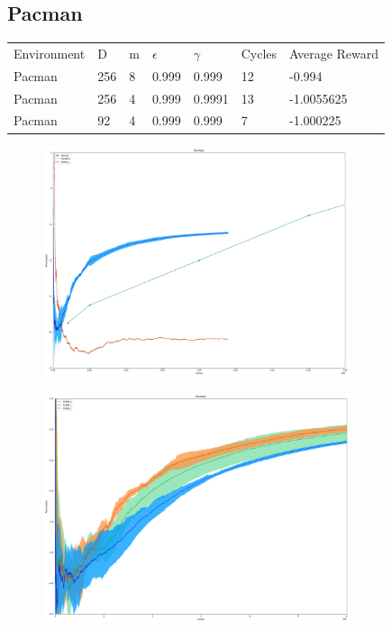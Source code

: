 \documentclass{article}
\theoremstyle{definition}
\newtheorem{primary statistics}[definition]{Primary Statistics}
\newtheorem{auxiliary statistics}[definition]{Auxiliary Statistics}
\begin{document}
\newpage

\subsection{Pacman}
 \begin{tabular}{lllllll}
 \centering
Environment & D & m & $\epsilon$ & $\gamma$ & Cycles & Average Reward \\
Pacman      & 256       & 8           & 0.999       & 0.999             & 12     & -0.994        \\
Pacman      & 256       & 4           & 0.999       & 0.9991            & 13     & -1.0055625       \\
Pacman      & 92        & 4           & 0.999       & 0.999             & 7      &    -1.000225           
\end{tabular}

 \begin{figure}[h]
 \centering
    \includegraphics[width=9cm]{RvVvU_Pacman}
\end{figure}

 \begin{figure}[h]
 \centering
    \includegraphics[width=9cm]{BT_Pacman}
\end{figure}
\end{document}
